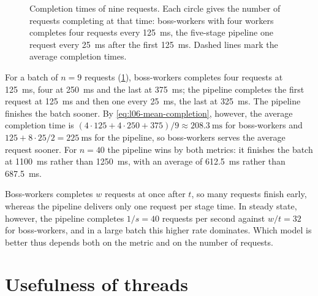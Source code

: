 \documentclass[../main.tex]{subfiles}
\begin{document}
\begin{figure}[htbp]
  \centering
  
  \caption{Completion times of nine requests.  Each circle gives the number
    of requests completing at that time: boss-workers with four workers
    completes four requests every \SI{125}{\milli\second}, the five-stage
    pipeline one request every \SI{25}{\milli\second} after the first
    \SI{125}{\milli\second}.  Dashed lines mark the average completion
    times.}
  \label{fig:l06-completion}
\end{figure}

\begin{example}
  \label{ex:l06-completion}
  For a batch of $n = 9$ requests (\cref{fig:l06-completion}), boss-workers
  completes four requests at \SI{125}{\milli\second}, four at
  \SI{250}{\milli\second} and the last at \SI{375}{\milli\second}; the
  pipeline completes the first request at \SI{125}{\milli\second} and then
  one every \SI{25}{\milli\second}, the last at \SI{325}{\milli\second}.
  The pipeline finishes the batch sooner.  By
  \cref{eq:l06-mean-completion}, however, the average completion time is
  $(4 \cdot 125 + 4 \cdot 250 + 375)/9 \approx \SI{208.3}{\milli\second}$
  for boss-workers and $125 + 8 \cdot 25/2 = \SI{225}{\milli\second}$ for
  the pipeline, so boss-workers serves the average request sooner.  For
  $n = 40$ the pipeline wins by both metrics: it finishes the batch at
  \SI{1100}{\milli\second} rather than \SI{1250}{\milli\second}, with an
  average of \SI{612.5}{\milli\second} rather than
  \SI{687.5}{\milli\second}.
\end{example}

Boss-workers completes $w$ requests at once after $t$, so many requests
finish early, whereas the pipeline delivers only one request per stage
time.  In steady state, however, the pipeline completes $1/s = 40$ requests
per second against $w/t = 32$ for boss-workers, and in a large batch this
higher rate dominates.  Which model is better thus depends both on the
metric and on the number of requests.

\section{Usefulness of threads}
\label{sec:l06-useful}
\end{document}
